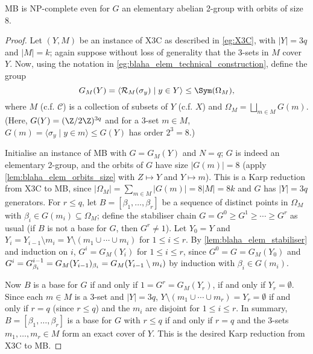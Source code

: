 \begin{theorem}\label{thm:blaha_elem_NP_complete}
    MB is NP-complete even for $G$ an elementary abelian 2-group with orbits of size 8.
\end{theorem}

\begin{proof}
    Let $(Y,M)$ be an instance of X3C as described in \autoref{eg:X3C}, with $|Y| = 3q$ and $|M| = k$; again suppose without loss of generality that the 3-sets in $M$ cover $Y$. Now, using the notation in \autoref{eg:blaha_elem_technical_construction}, define the group
    $$G_M(Y) = \langle \mathcal{R}_M(\sigma_y) \mid y \in Y \rangle \leq \Sym(\Omega_M),$$ where $M$ (c.f. $\mathcal{C}$) is a collection of subsets of $Y$ (c.f. $X$) and $\Omega_M = \bigsqcup_{m \in M} G(m)$. (Here, $G(Y) = (\Z/2\Z)^{3q}$ and for a 3-set $m \in M$, $G(m) = \langle \sigma_y \mid y \in m \rangle \leq G(Y)$ has order $2^3 = 8$.)

    Initialise an instance of MB with $G = G_M(Y)$ and $N = q$; $G$ is indeed an elementary  2-group, and the orbits of $G$ have size $|G(m)| = 8$ (apply \autoref{lem:blaha_elem_orbits_size} with $Z \mapsto Y$ and $Y \mapsto m$). This is a Karp reduction from X3C to MB, since $|\Omega_M| = \sum_{m \in M} |G(m)| = 8|M| = 8k$ and $G$ has $|Y| = 3q$ generators. For $r \leq q$, let $B = [\beta_1,\dotsc,\beta_r]$ be a sequence of distinct points in $\Omega_M$ with $\beta_i \in G(m_i) \subseteq \Omega_M$; define the stabiliser chain $G = G^0 \geq G^1 \geq \dotsb \geq G^r$ as usual (if $B$ is not a base for $G$, then $G^r \neq 1$). Let $Y_0 = Y$ and $Y_i = Y_{i-1} \setminus m_i = Y \setminus (m_1 \cup \dotsb \cup m_i)$ for $1 \leq i \leq r$. By \autoref{lem:blaha_elem_stabiliser} and induction on $i$, $G^i = G_M(Y_i)$ for $1 \leq i \leq r$, since $G^0 = G = G_M(Y_0)$ and $G^i = \added{2}{G^{i-1}_{\beta_i}} = \added{2}{G_M(Y_{i-1})_{\beta_i}} = G_M(Y_{i-1} \setminus m_i)$ by induction with $\beta_i \in G(m_i)$.

    Now $B$ is a base for $G$ if and only if $1 = G^r = G_M(Y_r)$, if and only if $Y_r = \emptyset$. Since each $m \in M$ is a 3-set and $|Y| = 3q$, $Y \setminus (m_1 \cup \dotsb \cup m_r) = Y_r = \emptyset$ if and only if $r = q$ (since $r \leq q$) and the $m_i$ are disjoint for $1 \leq i \leq r$. In summary, $B = [\beta_1,\dotsc,\beta_r]$ is a base for $G$ with $r \leq q$ if and only if $r = q$ and the 3-sets $m_1,\dotsc,m_r \in M$ form an exact cover of $Y$. This is the desired Karp reduction from X3C to MB.
\end{proof}

